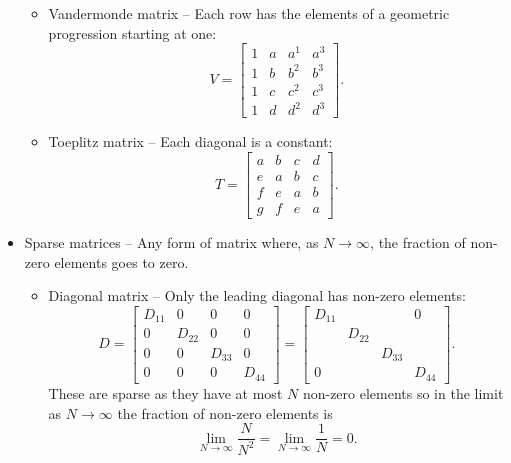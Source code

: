 \documentclass[a4paper]{article}
\begin{document}
\begin{itemize}
\begin{itemize}
            \item Vandermonde matrix -- Each row has the elements of a geometric progression starting at one:
            \[
                V =
                \begin{bmatrix}
                	1 & a & a^1 & a^3 \\
                	1 & b & b^2 & b^3 \\
                	1 & c & c^2 & c^3 \\
                	1 & d & d^2 & d^3
                \end{bmatrix}
                .
            \]
            
            \item Toeplitz matrix -- Each diagonal is a constant:
            \[
                T =
                \begin{bmatrix}
                	a & b & c & d \\
                	e & a & b & c \\
                	f & e & a & b \\
                	g & f & e & a
                \end{bmatrix}
                .
            \]
        \end{itemize}
        
        \item Sparse matrices -- Any form of matrix where, as \(N\to\infty\), the fraction of non-zero elements goes to zero.
        
        \begin{itemize}
            \item Diagonal matrix -- Only the leading diagonal has non-zero elements:
            \[
                D =
                \begin{bmatrix}
                	D_{11} & 0      & 0      & 0      \\
                	0      & D_{22} & 0      & 0      \\
                	0      & 0      & D_{33} & 0      \\
                	0      & 0      & 0      & D_{44}
                \end{bmatrix}
                =
                \begin{bmatrix}
                    D_{11} &        &        & 0      \\
                           & D_{22} &        &        \\
                           &        & D_{33} &        \\
                    0      &        &        & D_{44}
                \end{bmatrix}
                .
            \]
            These are sparse as they have at most \(N\) non-zero elements so in the limit as \(N \to \infty\) the fraction of non-zero elements is
            \[\lim_{N\to\infty} \frac{N}{N^2} = \lim_{N\to\infty}\frac{1}{N} = 0.\]
            

\end{itemize}
\end{itemize}
\end{document}
